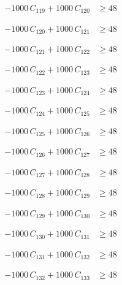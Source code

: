 \documentclass[a4paper,11pt]{article}
\begin{document}
\begin{align}
-1000\,C_{119} + 1000\,C_{120} &\geq 48 \nonumber
\end{align}

\begin{align}
-1000\,C_{120} + 1000\,C_{121} &\geq 48 \nonumber
\end{align}

\begin{align}
-1000\,C_{121} + 1000\,C_{122} &\geq 48 \nonumber
\end{align}

\begin{align}
-1000\,C_{122} + 1000\,C_{123} &\geq 48 \nonumber
\end{align}

\begin{align}
-1000\,C_{123} + 1000\,C_{124} &\geq 48 \nonumber
\end{align}

\begin{align}
-1000\,C_{124} + 1000\,C_{125} &\geq 48 \nonumber
\end{align}

\begin{align}
-1000\,C_{125} + 1000\,C_{126} &\geq 48 \nonumber
\end{align}

\begin{align}
-1000\,C_{126} + 1000\,C_{127} &\geq 48 \nonumber
\end{align}

\begin{align}
-1000\,C_{127} + 1000\,C_{128} &\geq 48 \nonumber
\end{align}

\begin{align}
-1000\,C_{128} + 1000\,C_{129} &\geq 48 \nonumber
\end{align}

\begin{align}
-1000\,C_{129} + 1000\,C_{130} &\geq 48 \nonumber
\end{align}

\begin{align}
-1000\,C_{130} + 1000\,C_{131} &\geq 48 \nonumber
\end{align}

\begin{align}
-1000\,C_{131} + 1000\,C_{132} &\geq 48 \nonumber
\end{align}

\begin{align}
-1000\,C_{132} + 1000\,C_{133} &\geq 48 \nonumber
\end{align}
\end{document}
